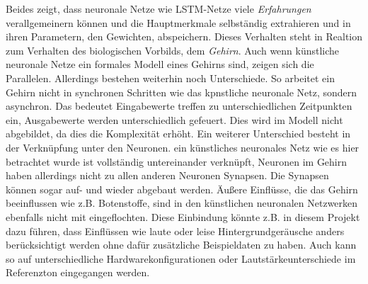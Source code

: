 Beides zeigt, dass neuronale Netze wie \ac{LSTM}-Netze viele
\textit{Erfahrungen} verallgemeinern können und die Hauptmerkmale selbständig
extrahieren und in ihren Parametern, den Gewichten, abspeichern. Dieses
Verhalten steht in Realtion zum Verhalten des biologischen Vorbilds, dem
\textit{Gehirn}. Auch wenn künstliche neuronale Netze ein formales Modell eines
Gehirns sind, zeigen sich die Parallelen. Allerdings bestehen weiterhin noch
Unterschiede. So arbeitet ein Gehirn nicht in synchronen Schritten wie das
kpnstliche neuronale Netz, sondern asynchron. Das bedeutet Eingabewerte treffen
zu unterschiedlichen Zeitpunkten ein, Ausgabewerte werden unterschiedlich
gefeuert. Dies wird im Modell nicht abgebildet, da dies die Komplexität erhöht.
Ein weiterer Unterschied besteht in der Verknüpfung unter den Neuronen. ein
künstliches neuronales Netz wie es hier betrachtet wurde ist vollständig
untereinander verknüpft, Neuronen im Gehirn haben allerdings nicht zu allen
anderen Neuronen Synapsen. Die Synapsen können sogar auf- und wieder abgebaut
werden. Äußere Einflüsse, die das Gehirn beeinflussen wie z.B. Botenstoffe, sind
in den künstlichen neuronalen Netzwerken ebenfalls nicht mit eingeflochten.
Diese Einbindung könnte z.B. in diesem Projekt dazu führen, dass Einflüssen wie
laute oder leise Hintergrundgeräusche anders berücksichtigt werden ohne dafür
zusätzliche Beispieldaten zu haben. Auch kann so auf unterschiedliche
Hardwarekonfigurationen oder Lautstärkeunterschiede im Referenzton eingegangen
werden.


\nocite{schaul2010,GERS2001,WIKI2013,Schmidhuber2013,LSTM1,Nerbonne1}
